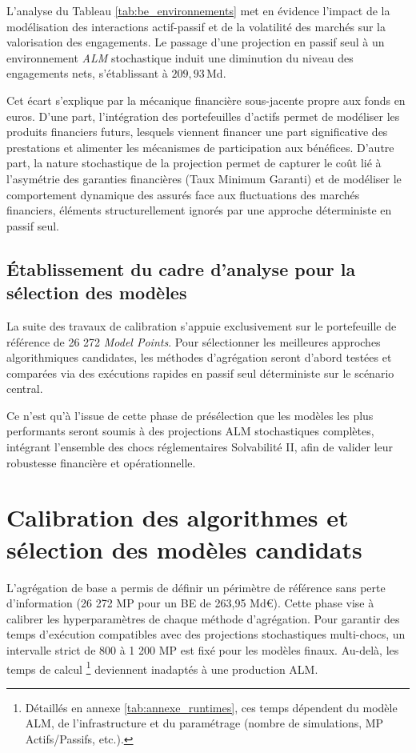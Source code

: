 L'analyse du Tableau \ref{tab:be_environnements} met en évidence l'impact de la modélisation des interactions actif-passif et de la volatilité des marchés sur la valorisation des engagements. Le passage d'une projection en passif seul à un environnement \textit{ALM} stochastique induit une diminution du niveau des engagements nets, s'établissant à $209{,}93$\,Md\texteuro.

Cet écart s'explique par la mécanique financière sous-jacente propre aux fonds en euros. D'une part, l'intégration des portefeuilles d'actifs permet de modéliser les produits financiers futurs, lesquels viennent financer une part significative des prestations et alimenter les mécanismes de participation aux bénéfices. D'autre part, la nature stochastique de la projection permet de capturer le coût lié à l'asymétrie des garanties financières (Taux Minimum Garanti) et de modéliser le comportement dynamique des assurés face aux fluctuations des marchés financiers, éléments structurellement ignorés par une approche déterministe en passif seul.

\subsection{Établissement du cadre d'analyse pour la sélection des modèles}

La suite des travaux de calibration s'appuie exclusivement sur le portefeuille de référence de 26 272 \textit{Model Points}. Pour sélectionner les meilleures approches algorithmiques candidates, les méthodes d'agrégation seront d'abord testées et comparées via des exécutions rapides en passif seul déterministe sur le scénario central. 

Ce n'est qu'à l'issue de cette phase de présélection que les modèles les plus performants seront soumis à des projections ALM stochastiques complètes, intégrant l'ensemble des chocs réglementaires Solvabilité II, afin de valider leur robustesse financière et opérationnelle.

\section{Calibration des algorithmes et sélection des modèles candidats}
\label{sec:calibration_pareto}

L'agrégation de base a permis de définir un périmètre de référence sans perte d'information (26 272 MP pour un BE de 263{,}95 Md\euro{}). Cette phase vise à calibrer les hyperparamètres de chaque méthode d'agrégation. Pour garantir des temps d'exécution compatibles avec des projections stochastiques multi-chocs, un intervalle strict de 800 à 1 200 MP est fixé pour les modèles finaux. Au-delà, les temps de calcul \footnote{Détaillés en annexe \ref{tab:annexe_runtimes}, ces temps dépendent du modèle ALM, de l'infrastructure et du paramétrage (nombre de simulations, MP Actifs/Passifs, etc.).} deviennent inadaptés à une production ALM.

